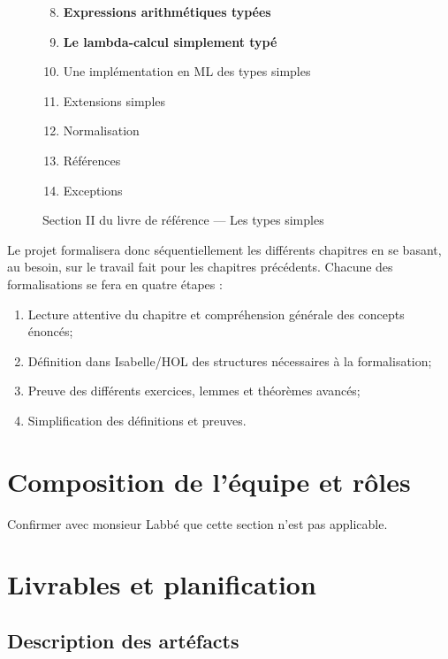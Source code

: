 \documentclass[a4paper, oneside, 12pt, titlepage, draft]{article}
\begin{document}
\begin{figure}[h]
  \begin{center}
    \begin{enumerate}[label=§ \arabic*]
        \setcounter{enumi}{7}
      \item \textbf{Expressions arithmétiques typées}
      \item \textbf{Le lambda-calcul simplement typé}
      \item Une implémentation en ML des types simples
      \item Extensions simples
      \item Normalisation
      \item Références
      \item Exceptions
    \end{enumerate}
  \end{center}
  \caption{Section II du livre de référence --- Les types simples}
  \label{fig:TAPL-section-2}
\end{figure}

Le projet formalisera donc séquentiellement les différents chapitres en se basant, au besoin, sur le
travail fait pour les chapitres précédents. Chacune des formalisations se fera en quatre étapes :

\begin{enumerate}
  \item Lecture attentive du chapitre et compréhension générale des concepts énoncés;
  \item Définition dans Isabelle/HOL des structures nécessaires à la formalisation;
  \item Preuve des différents exercices, lemmes et théorèmes avancés;
  \item Simplification des définitions et preuves.
\end{enumerate}

\section{Composition de l'équipe et rôles}

Confirmer avec monsieur Labbé que cette section n'est pas applicable.

\section{Livrables et planification}

\subsection{Description des artéfacts}
\end{document}
